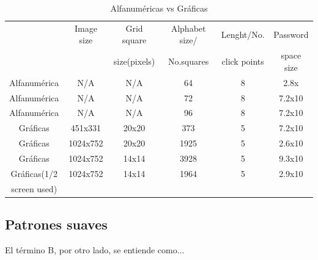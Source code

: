\documentclass[12pt]{report}
\begin{document}
\begin{table}[h!]
	\centering
	\begin{tabular}{|c|c|c|c|c|c|}
		\hline
				 	 
		         		 & Image size &   Grid square &	Alphabet size/ &Lenght/No.  & Password \\ 
		                &           &  size(pixels)  & No.squares& click points & space size \\ \hline
		Alfanumérica    & N/A       & N/A     & 64   & 8  & 2.8x \\ \hline
		Alfanumérica    & N/A       & N/A     & 72   & 8  & 7.2x10 \\ \hline
		Alfanumérica    & N/A       & N/A     & 96   & 8  & 7.2x10 \\ \hline
		Gráficas        & 451x331   & 20x20   & 373  & 5  & 7.2x10 \\ \hline
		Gráficas        & 1024x752  & 20x20   & 1925 & 5  & 2.6x10 \\ \hline
		Gráficas        & 1024x752  & 14x14   & 3928 & 5  & 9.3x10 \\ \hline
		Gráficas(1/2   & 1024x752  & 14x14   & 1964 & 5  & 2.9x10 \\ 
		screen used)   &   &    &  &  &  \\ \hline
	\end{tabular}
	\caption{Alfanuméricas vs Gráficas}
	\label{tabla:Alfanuméricas vs Gráficashhh}
\end{table}


	

	
	
	
	

\subsection{Patrones suaves}
El término B, por otro lado, se entiende como...
\end{document}
